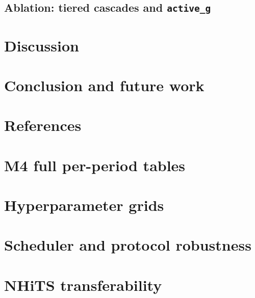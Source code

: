\documentclass{article}
\begin{document}
\subsection{Ablation: tiered cascades and \texttt{active\_g}}
\label{sec:ablations}

\section{Discussion}
\label{sec:discussion}

\section{Conclusion and future work}
\label{sec:conclusion}

\begin{ack}
\end{ack}

\section*{References}
{
\small
}

\appendix

\section{M4 full per-period tables}
\label{app:m4_tables}

\section{Hyperparameter grids}
\label{app:hyperparams}

\section{Scheduler and protocol robustness}
\label{app:scheduler}

\section{NHiTS transferability}
\label{app:nhits}

\newpage

\end{document}
